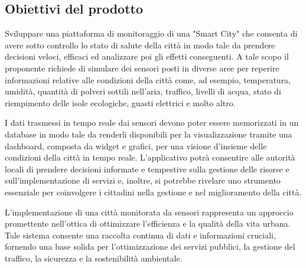 \subsection{Obiettivi del prodotto}
Sviluppare una piattaforma di monitoraggio di una "Smart City" che consenta di avere sotto
controllo lo stato di salute della città in modo tale da prendere decisioni veloci, efficaci
ed analizzare poi gli effetti conseguenti.
A tale scopo il proponente richiede di simulare dei sensori posti in diverse aree per reperire
informazioni relative alle condizioni della città come, ad esempio, temperatura, umidità,
quantità di polveri sottili nell’aria, traffico, livelli di acqua, stato di riempimento delle isole ecologiche,
guasti elettrici e molto altro.

I dati trasmessi in tempo reale dai sensori devono poter essere memorizzati in un database
in modo tale da renderli disponibili per la visualizzazione tramite una dashboard, composta da widget e grafici, per una visione d’insieme delle condizioni della città in
tempo reale.
L’applicativo potrà consentire alle autorità locali di prendere decisioni informate e tempestive sulla gestione delle risorse e sull’implementazione di servizi e, inoltre, si potrebbe
rivelare uno strumento essenziale per coinvolgere i cittadini nella gestione e nel miglioramento della città.
\vspace{0.3cm}

L’implementazione di una città monitorata da sensori rappresenta un approccio promettente nell’ottica di ottimizzare l’efficienza e la qualità della vita urbana. Tale sistema consente
una raccolta continua di dati e informazioni cruciali, fornendo una base solida per l’ottimizzazione dei servizi pubblici, la gestione del traffico, la sicurezza e la sostenibilità ambientale.

